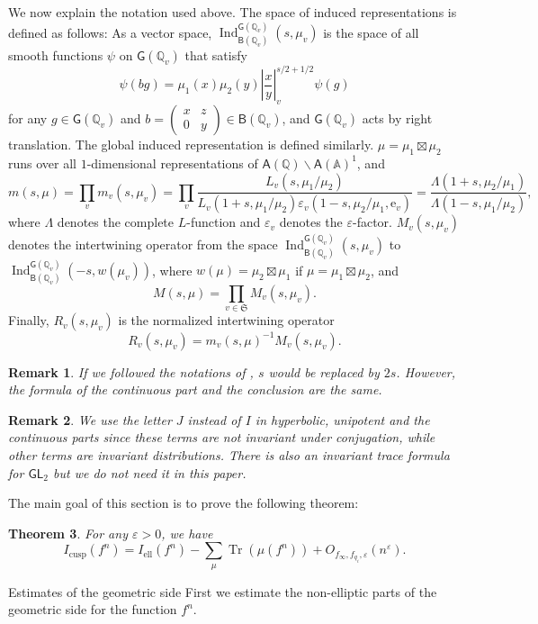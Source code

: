 \documentclass[10pt,oneside,reqno]{amsart}
\makeatletter
\newcommand\rme{\mathrm{e}}
\renewcommand\AA{\mathbb{A}}
\newcommand\QQ{\mathbb{Q}}
\newcommand\mf[1]{\mathfrak{#1}}
\newcommand\A{\mathsf{A}}
\newcommand\B{\mathsf{B}}
\newcommand\G{\mathsf{G}}
\newcommand\GL{\mathsf{GL}}
\newcommand\bs{\backslash}
\DeclareMathOperator\Tr{Tr}
\DeclareMathOperator\Ind{Ind}
\newcommand\el{\mathrm{ell}}
\def\subsection{\@startsection{subsection}{2}
  \z@{3pt\@plus0pt}{-.5em}%
  {\normalfont\bfseries}}
\theoremstyle{THEOREM}
\newtheorem{theorem}{Theorem}[section]
\theoremstyle{DEFINITION}
\theoremstyle{EXERCISE}
\newtheorem{remark}[theorem]{Remark}
\numberwithin{equation}{section}
\makeatother
\begin{document}
We now explain the notation used above. The space of induced representations is defined as follows:
As a vector space, $\Ind_{\B(\QQ_v)}^{\G(\QQ_v)}(s,\mu_v)$ is the space of all smooth functions $\psi$ on $\G(\QQ_v)$ that satisfy
\[
\psi(bg)=\mu_1(x)\mu_2(y)\left|\frac{x}{y}\right|_v^{s/2+1/2}\psi(g)
\] 
for any $g\in \G(\QQ_v)$ and $b=(\begin{smallmatrix} x & z \\ 0 & y \end{smallmatrix})\in \B(\QQ_v)$, and $\G(\QQ_v)$ acts by right translation. The global induced representation is defined similarly. 
$\mu=\mu_1\boxtimes\mu_2$ runs over all $1$-dimensional representations of $\A(\QQ)\bs \A(\AA)^1$, and
\[
m(s,\mu)=\prod_{v}m_v(s,\mu_v)=\prod_{v}\frac{L_v(s,\mu_1/\mu_2)}{L_v(1+s,\mu_1/\mu_2)\varepsilon_v(1-s,\mu_2/\mu_1,\rme_v)} =\frac{\Lambda(1+s,\mu_2/\mu_1)}{\Lambda(1-s,\mu_1/\mu_2)},
\]
where $\Lambda$ denotes the complete $L$-function and $\varepsilon_v$ denotes the $\varepsilon$-factor.
$M_v(s,\mu_v)$ denotes the intertwining operator from the space $\Ind_{\B(\QQ_v)}^{\G(\QQ_v)}(s,\mu_v)$ to $\Ind_{\B(\QQ_v)}^{\G(\QQ_v)}(-s,w(\mu_v))$, where $w(\mu)=\mu_2\boxtimes\mu_1$ if $\mu=\mu_1\boxtimes\mu_2$, and
\[
M(s,\mu)=\prod_{v\in \mf{S}}M_v(s,\mu_v).
\]
Finally, 
$R_v(s,\mu_v)$ is the normalized intertwining operator 
\[
R_v(s,\mu_v)=m_v(s,\mu)^{-1}M_v(s,\mu_v).
\]

\begin{remark}
If we followed the notations of \cite{gelbart1979}, $s$ would be replaced by $2s$. However, the formula of the continuous part and the conclusion are the same.
\end{remark}
\begin{remark}
We use the letter $J$ instead of $I$ in hyperbolic, unipotent and the continuous parts since these terms are not invariant under conjugation, while other terms are invariant distributions. There is also an \emph{invariant trace formula} for $\GL_2$ but we do not need it in this paper.
\end{remark}

The main goal of this section is to prove the following theorem:
\begin{theorem}\label{thm:cuspidalestimate}
For any $\varepsilon>0$, we have
\[
I_{\mathrm{cusp}}(f^n)=I_\el(f^n)-\sum_{\mu}\Tr(\mu(f^n))+O_{f_\infty,f_{q_i},\varepsilon}(n^\varepsilon).
\]
\end{theorem}

\subsection{Estimates of the geometric side}
First we estimate the non-elliptic parts of the geometric side for the function $f^n$.
\end{document}
